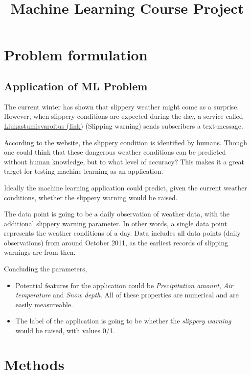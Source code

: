 \documentclass[12pt, a4paper]{report}
\title{Machine Learning Course Project}
\begin{document}
    \section{Problem formulation}
    \subsection{Application of ML Problem}
    The current winter has shown that slippery weather might come as a surprise.
    However, when slippery conditions are expected during the day, a service called \href{https://liukastumisvaroitus.fi/en/}{Liukastumisvaroitus (link)} (Slipping warning) sends subscribers a text-message.

    According to the website, the slippery condition is identified by humans.
    Though one could think that these dangerous weather conditions can be predicted without 
    human knowledge, but to what level of accuracy? This makes it a great target for testing machine learning as an application.
    
    Ideally the machine learning application could predict, given the current weather conditions, whether the slippery warning would be raised.

    The data point is going to be a daily observation of weather data, with the additional
    slippery warning parameter. In other words, a single data point represents the weather conditions of a day. Data includes all data points (daily observations) from around 
    October 2011, as the earliest records of slipping warnings are from then.

    Concluding the parameters, 
    \begin{itemize}
      \item Potential features for the application could be \textit{Precipitation amount}, \textit{Air temperature} and \textit{Snow depth}. All of these properties are numerical and are easily measureable.
      \item The label of the application is going to be whether the \textit{slippery warning} would be raised, with values 0/1.
    \end{itemize}
    
    \section{Methods}
\end{document}

